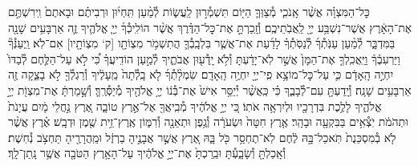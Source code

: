 \documentclass[twoside, openany, parskip=half, 11pt]{book}
\begin{document}
\begin{footnotesize}
\begin{multicols}{2}
כׇּל־הַמִּצְוָ֗ה אֲשֶׁ֨ר אָֽנֹכִ֧י מְ֯צַוְּךָ֛ הַיּ֖וֹם תִּשְׁמְ֯ר֣וּן לַֽעֲשׂ֑וֹת לְ֯מַ֨עַן תִּֽחְי֜וּן וּרְבִיתֶ֗ם וּבָאתֶם֙ וִֽירִשְׁתֶּ֣ם אֶת־הָאָ֔רֶץ אֲשֶׁר־נִשְׁבַּ֥ע יְיָ֖ לַֽאֲבֹֽתֵיכֶֽם׃ וְ֯זָֽכַרְתָּ֣ אֶת־כׇּל־הַדֶּ֗רֶךְ אֲשֶׁ֨ר הוֹלִֽיכְ֯ךָ֜ יְיָ֧ אֱלֹהֶ֛יךָ זֶ֛ה אַרְבָּעִ֥ים שָׁנָ֖ה בַּמִּדְבָּ֑ר לְ֯מַ֨עַן עַנֹּֽתְ֯ךָ֜ לְ֯נַסֹּֽתְ֯ךָ֗ לָדַ֜עַת אֶת־אֲשֶׁ֧ר בִּלְבָֽבְ֯ךָ֛ הֲתִשְׁמֹ֥ר מִצְוֹתָ֖ו [ק‘ מִצְוֹתָ֖יו] אִם־לֹֽא׃ וַֽיְעַנְּ֯ךָ֘ וַיַּרְעִבֶ֒ךָ֒ וַיַּֽאֲכִֽלְךָ֤ אֶת־הַמָּן֙ אֲשֶׁ֣ר לֹֽא־יָדַ֔עְתָּ וְ֯לֹ֥א יָֽדְ֯ע֖וּן אֲבֹתֶ֑יךָ לְ֯מַ֣עַן הוֹדִֽיעֲךָ֗ כִּ֠י לֹ֣א עַל־הַלֶּ֤חֶם לְ֯בַדּוֹ֙ יִחְיֶ֣ה הָֽאָדָ֔ם כִּ֛י עַל־כׇּל־מוֹצָ֥א פִֽי־יְיָ֖ יִחְיֶ֥ה הָֽאָדָֽם׃  שִׂמְלָ֨תְ֯ךָ֜ לֹ֤א בָֽלְ֯תָה֙ מֵֽעָלֶ֔יךָ וְ֯רַגְלְ֯ךָ֖ לֹ֣א בָצֵ֑קָה זֶ֖ה אַרְבָּעִ֥ים שָׁנָֽה׃ וְ֯יָֽדַעְתָּ֖ עִם־לְ֯בָבֶ֑ךָ כִּ֗י כַּֽאֲשֶׁ֨ר יְ֯יַסֵּ֥ר אִישׁ֙ אֶת־בְּ֯נ֔וֹ יְיָ֥ אֱלֹהֶ֖יךָ מְ֯יַסְּ֯רֶֽךָּ׃ וְ֯שָׁ֣מַרְתָּ֔ אֶת־מִצְוֹ֖ת יְיָ֣ אֱלֹהֶ֑יךָ לָלֶ֥כֶת בִּדְרָכָ֖יו וּלְיִרְאָ֥ה אֹתֽוֹ׃ כִּ֚י יְיָ֣ אֱלֹהֶ֔יךָ מְ֯בִֽיאֲךָ֖ אֶל־אֶ֣רֶץ טוֹבָ֑ה אֶ֚רֶץ נַ֣חֲלֵי מָ֔יִם עֲיָנֹת֙ וּתְהֹמֹ֔ת יֹֽצְ֯אִ֥ים בַּבִּקְעָ֖ה וּבָהָֽר׃ אֶ֤רֶץ חִטָּה֙ וּשְׂעֹרָ֔ה וְ֯גֶ֥פֶן וּתְאֵנָ֖ה וְ֯רִמּ֑וֹן אֶֽרֶץ־זֵ֥ית שֶׁ֖מֶן וּדְבָֽשׁ׃ אֶ֗רֶץ אֲשֶׁ֨ר לֹ֤א בְ֯מִסְכֵּנֻת֙ תֹּֽאכַל־בָּ֣הּ לֶ֔חֶם לֹֽא־תֶחְסַ֥ר כֹּ֖ל בָּ֑הּ אֶ֚רֶץ אֲשֶׁ֣ר אֲבָנֶ֣יהָ בַרְזֶ֔ל וּמֵֽהֲרָרֶ֖יהָ תַּחְצֹ֥ב נְ֯חֽשֶׁת׃ וְ֯אָֽכַלְתָּ֖ וְ֯שָׂבָ֑עְ֯תָּ וּבֵֽרַכְתָּ֙ אֶת־יְיָ֣ אֱלֹהֶ֔יךָ עַל־הָאָ֥רֶץ הַטֹּבָ֖ה אֲשֶׁ֥ר נָֽתַן־לָֽךְ׃


\end{multicols}
\end{footnotesize}
\end{document}
